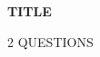 \documentclass[12pt,a4paper]{article}
\begin{document}
\begin{center}
\LARGE{\textbf{{TITLE}}}
\end{center}
\begin{multicols}{2}
{QUESTIONS}
\end{multicols}
\end{document}
